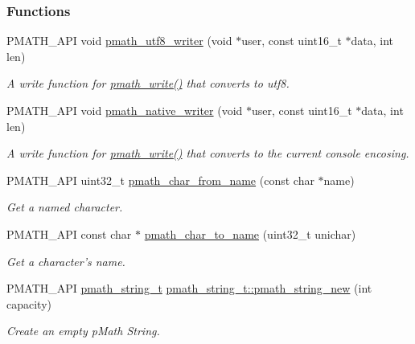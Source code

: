 \subsubsection*{Functions}
\begin{CompactItemize}
\item 
PMATH\_\-API void \hyperlink{group__strings_g5e7a9b1a5eb8861e94dc1bea92c77424}{pmath\_\-utf8\_\-writer} (void $\ast$user, const uint16\_\-t $\ast$data, int len)
\begin{CompactList}\small\item\em A {\em write\/} function for \hyperlink{group__objects_g9f909b9eb04317260ee8630d10e5a7c6}{pmath\_\-write()} that converts to utf8. \item\end{CompactList}\item 
PMATH\_\-API void \hyperlink{group__strings_ga3ecac6a71274a3e43cedadb10085f2b}{pmath\_\-native\_\-writer} (void $\ast$user, const uint16\_\-t $\ast$data, int len)
\begin{CompactList}\small\item\em A {\em write\/} function for \hyperlink{group__objects_g9f909b9eb04317260ee8630d10e5a7c6}{pmath\_\-write()} that converts to the current console encosing. \item\end{CompactList}\item 
PMATH\_\-API uint32\_\-t \hyperlink{group__strings_g963fd4f434edb806b3f2262726d849be}{pmath\_\-char\_\-from\_\-name} (const char $\ast$name)
\begin{CompactList}\small\item\em Get a named character. \item\end{CompactList}\item 
PMATH\_\-API const char $\ast$ \hyperlink{group__strings_g21de2fb0e4e344d00d728f1c2fc4a941}{pmath\_\-char\_\-to\_\-name} (uint32\_\-t unichar)
\begin{CompactList}\small\item\em Get a character's name. \item\end{CompactList}\item 
PMATH\_\-API \hyperlink{classpmath__string__t}{pmath\_\-string\_\-t} \hyperlink{group__strings_g9f860fe571fcb87515b82ddc704c93ef}{pmath\_\-string\_\-t::pmath\_\-string\_\-new} (int capacity)
\begin{CompactList}\small\item\em Create an empty pMath String. \item\end{CompactList}\item 

\end{CompactItemize}
